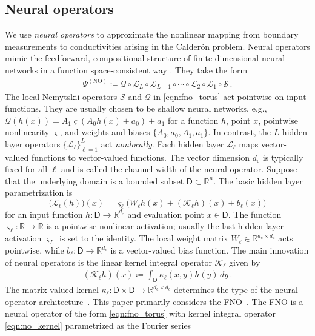 \documentclass[pdflatex,sn-mathphys-num]{sn-jnl-preprint}
\newcommand{\R}{\mathbb{R}}
\newcommand{\cL}{\mathcal{L}}
\newcommand{\cS}{\mathcal{S}}
\newcommand{\cK}{\mathcal{K}}
\newcommand{\cQ}{\mathcal{Q}}
\newcommand{\sfD}{\mathsf{D}}
\newcommand{\defeq}{\coloneqq} %
\newcommand{\diff}{d}
\newcommand{\dd}[1]{\,\diff{#1}}
\theoremstyle{thmstyleone}%
\theoremstyle{thmstyletwo}%
\theoremstyle{thmstylethree}%
\numberwithin{equation}{section}
\numberwithin{theorem}{section}
\begin{document}
\subsection{Neural operators}\label{sec:prelim_neural}
We use \emph{neural operators} to approximate the nonlinear mapping from boundary measurements to conductivities arising in the Calder\'on problem. Neural operators mimic the feedforward, compositional structure of finite-dimensional neural networks in a function space-consistent way \cite{kovachki2021neural}. They take the form
\begin{align}\label{eqn:fno_torus}
    \Psi^{(\mathrm{NO})}\defeq \cQ\circ\cL_L\circ\cL_{L-1}\circ\cdots\circ\cL_2\circ\cL_1\circ\cS\,.
\end{align}
The local Nemytskii operators $\cS$ and $\cQ$ in \eqref{eqn:fno_torus} act pointwise on input functions. They are usually chosen to be shallow neural networks, e.g., $\cQ(h(x))=A_1\varsigma(A_0 h(x) + a_0) +a_1$ for a function $h$, point $x$, pointwise nonlinearity $\varsigma$, and weights and biases $\{A_0,a_0,A_1,a_1\}$. In contrast, the $L$ hidden layer operators $\{\cL_\ell\}_{\ell=1}^L$ act \emph{nonlocally}. Each hidden layer $\cL_\ell$ maps vector-valued functions to vector-valued functions. The vector dimension $d_\mathrm{c}$ is typically fixed for all $\ell$ and is called the channel width of the neural operator. Suppose that the underlying domain is a bounded subset $\sfD\subset\R^n$.
The basic hidden layer parametrization is
\begin{equation}\label{eqn:no_layers}
    \bigl(\cL_{\ell}(h)\bigr)(x) = \varsigma_\ell\bigl(W_\ell h(x) + (\cK_\ell h)(x) + b_\ell(x)\bigr)
\end{equation}
for an input function $h\colon \sfD\to\R^{d_\mathrm{c}} $ and evaluation point $x\in\sfD$. The function $\varsigma_\ell\colon\R\to\R$ is a pointwise nonlinear activation; usually the last hidden layer activation $\varsigma_L$ is set to the identity. The local weight matrix $W_\ell \in \R^{d_\mathrm{c}\times d_\mathrm{c}}$ acts pointwise, while $b_\ell\colon\sfD\to\R^{d_\mathrm{c}}$ is a vector-valued bias function. The main innovation of neural operators is the linear kernel integral operator $\cK_\ell$ given by
\begin{align}\label{eqn:no_kernel}
    (\cK_\ell h)(x)\defeq\int_\sfD \kappa_\ell(x,y)h(y)\dd{y}\,.
\end{align}
The matrix-valued kernel $\kappa_\ell\colon\sfD\times\sfD\to\R^{d_\mathrm{c}\times d_\mathrm{c}}$ determines the type of the neural operator architecture~\cite[Sec.~4]{kovachki2021neural}. This paper primarily considers the FNO~\cite{li2020fourier}. The FNO is a neural operator of the form \eqref{eqn:fno_torus} with kernel integral operator \eqref{eqn:no_kernel} parametrized as the Fourier series
\end{document}
